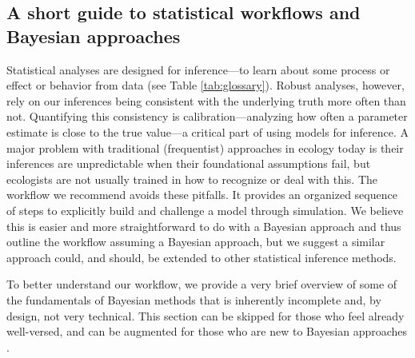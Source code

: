 \documentclass[11pt]{article}
\begin{document}
{\subsection*{A short guide to statistical workflows and Bayesian approaches}
Statistical analyses are designed for inference---to learn about some process or effect or behavior from data  (see Table \ref{tab:glossary}). Robust analyses, however, rely on our inferences being consistent with the underlying truth more often than not.  Quantifying this consistency is calibration---analyzing how often a parameter estimate is close to the true value---a critical part of using models for inference. A major problem with traditional (frequentist) approaches in ecology today is their inferences are unpredictable when their foundational assumptions fail, but ecologists are not usually trained in how to recognize or deal with this.
The workflow we recommend avoids these pitfalls. It provides an organized sequence of steps to explicitly build and challenge a model through simulation. We believe this is easier and more straightforward to do with a Bayesian approach and thus outline the workflow assuming a Bayesian approach, but we suggest a similar approach could, and should, be extended to other statistical inference methods. %

To better understand our workflow, we provide a very brief overview of some of the fundamentals of Bayesian methods that is inherently incomplete and, by design, not very technical. This section can be skipped for those who feel already well-versed, and can be augmented for those who are new to Bayesian approaches \citep[for example,][]{statrethink,BDA,regotherstories}.

}
\end{document}
